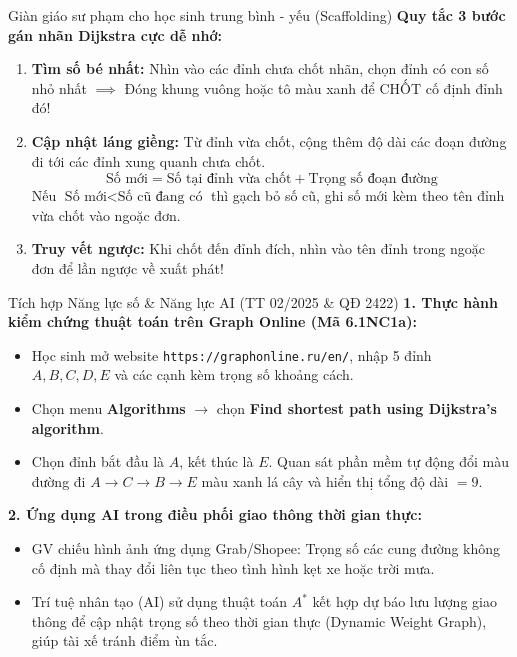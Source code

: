 \documentclass[12pt, a4paper]{article}
\begin{document}
\begin{scaffoldbox}{Giàn giáo sư phạm cho học sinh trung bình - yếu (Scaffolding)}
    \textbf{Quy tắc 3 bước gán nhãn Dijkstra cực dễ nhớ:}
    \begin{enumerate}[leftmargin=0.6cm]
        \item \textbf{Tìm số bé nhất:} Nhìn vào các đỉnh chưa chốt nhãn, chọn đỉnh có con số nhỏ nhất $\implies$ Đóng khung vuông hoặc tô màu xanh để CHỐT cố định đỉnh đó!
        \item \textbf{Cập nhật láng giềng:} Từ đỉnh vừa chốt, cộng thêm độ dài các đoạn đường đi tới các đỉnh xung quanh chưa chốt.
        $$\text{Số mới} = \text{Số tại đỉnh vừa chốt} + \text{Trọng số đoạn đường}$$
        Nếu $\text{Số mới} < \text{Số cũ đang có}$ thì gạch bỏ số cũ, ghi số mới kèm theo tên đỉnh vừa chốt vào ngoặc đơn.
        \item \textbf{Truy vết ngược:} Khi chốt đến đỉnh đích, nhìn vào tên đỉnh trong ngoặc đơn để lần ngược về xuất phát!
    \end{enumerate}
\end{scaffoldbox}

\begin{aibox}{Tích hợp Năng lực số \& Năng lực AI (TT 02/2025 \& QĐ 2422)}
    \textbf{1. Thực hành kiểm chứng thuật toán trên Graph Online (Mã 6.1NC1a):}
    \begin{itemize}[leftmargin=0.6cm]
        \item Học sinh mở website \texttt{https://graphonline.ru/en/}, nhập 5 đỉnh $A, B, C, D, E$ và các cạnh kèm trọng số khoảng cách.
        \item Chọn menu \textbf{Algorithms} $\rightarrow$ chọn \textbf{Find shortest path using Dijkstra's algorithm}.
        \item Chọn đỉnh bắt đầu là $A$, kết thúc là $E$. Quan sát phần mềm tự động đổi màu đường đi $A \to C \to B \to E$ màu xanh lá cây và hiển thị tổng độ dài $= 9$.
    \end{itemize}
    \textbf{2. Ứng dụng AI trong điều phối giao thông thời gian thực:}
    \begin{itemize}[leftmargin=0.6cm]
        \item GV chiếu hình ảnh ứng dụng Grab/Shopee: Trọng số các cung đường không cố định mà thay đổi liên tục theo tình hình kẹt xe hoặc trời mưa.
        \item Trí tuệ nhân tạo (AI) sử dụng thuật toán $A^*$ kết hợp dự báo lưu lượng giao thông để cập nhật trọng số theo thời gian thực (Dynamic Weight Graph), giúp tài xế tránh điểm ùn tắc.
    \end{itemize}
\end{aibox}
\end{document}
